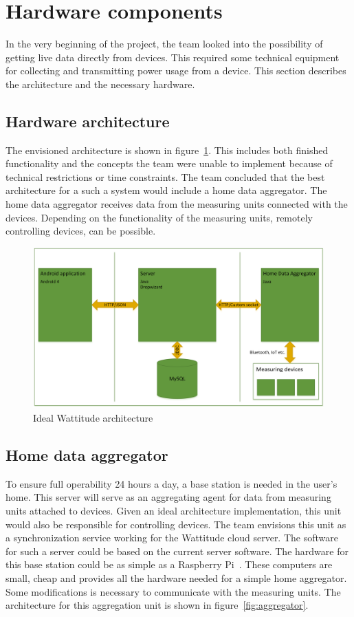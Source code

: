 \section{Hardware components}
\label{sec:hardwareComponents}
In the very beginning of the project, the team looked into the possibility of getting live data directly from devices. This required some technical equipment for collecting and transmitting power usage from a device. This section describes the architecture and the necessary hardware.

\subsection{Hardware architecture}

The envisioned architecture is shown in figure~\ref{fig:idealArchitecture}. This includes both finished functionality and the concepts the team were unable to implement because of technical restrictions or time constraints. The team concluded that the best architecture for a such a system would include a home data aggregator. The home data aggregator receives data from the measuring units connected with the devices. Depending on the functionality of the measuring units, remotely controlling devices, can be possible.

\begin{figure}[H]
\centering
\includegraphics[width=\textwidth]{ch/further/fig/architecture.png}
\caption{Ideal Wattitude architecture}
\label{fig:idealArchitecture}
\end{figure}


\subsection{Home data aggregator}
To ensure full operability 24 hours a day, a base station is needed in the user's home. This server will serve as an aggregating agent for data from measuring units attached to devices. Given an ideal architecture implementation, this unit would also be responsible for controlling devices. The team envisions this unit as a synchronization service working for the Wattitude cloud server. The software for such a server could be based on the current server software. The hardware for this base station could be as simple as a Raspberry Pi~\cite{pi}. These computers are small, cheap and provides all the hardware needed for a simple home aggregator. Some modifications is necessary to communicate with the measuring units. The architecture for this aggregation unit is shown in figure~\ref{fig:aggregator}.

